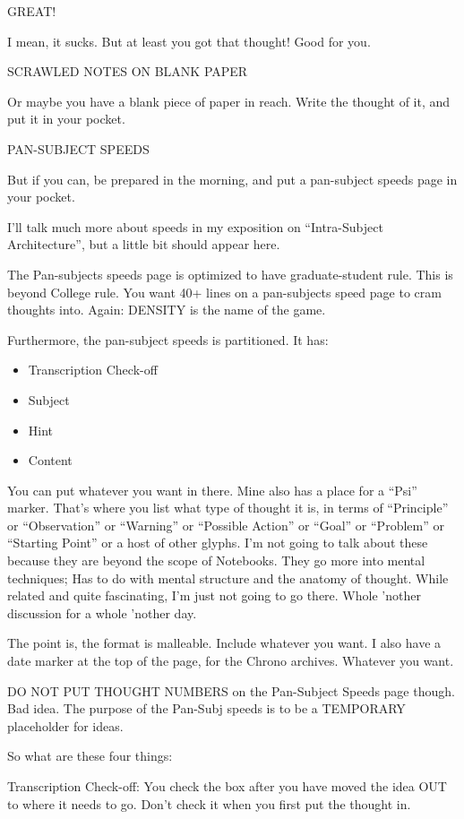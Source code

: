 \documentclass[oneside]{book}
\begin{document}
GREAT!

I mean, it sucks. But at least you got that thought! Good for you.

SCRAWLED NOTES ON BLANK PAPER

Or maybe you have a blank piece of paper in reach. Write the thought
of it, and put it in your pocket.

PAN-SUBJECT SPEEDS

But if you can, be prepared in the morning, and put a pan-subject
speeds page in your pocket.

I'll talk much more about speeds in my exposition on ``Intra-Subject
Architecture'', but a little bit should appear here.

The Pan-subjects speeds page is optimized to have graduate-student
rule. This is beyond College rule. You want 40+ lines on a
pan-subjects speed page to cram thoughts into. Again: DENSITY is the
name of the game.

Furthermore, the pan-subject speeds is partitioned. It has:

\begin{itemize}
\item Transcription Check-off
\item Subject
\item Hint
\item Content
\end{itemize}

You can put whatever you want in there. Mine also has a place for a
``Psi'' marker. That's where you list what type of thought it is, in
terms of ``Principle'' or ``Observation'' or ``Warning'' or ``Possible
Action'' or ``Goal'' or ``Problem'' or ``Starting Point'' or a host of other
glyphs. I'm not going to talk about these because they are beyond the
scope of Notebooks. They go more into mental techniques; Has to do
with mental structure and the anatomy of thought. While related and
quite fascinating, I'm just not going to go there. Whole 'nother
discussion for a whole 'nother day.

The point is, the format is malleable. Include whatever you want. I
also have a date marker at the top of the page, for the Chrono
archives. Whatever you want.

DO NOT PUT THOUGHT NUMBERS on the Pan-Subject Speeds page though. Bad
idea. The purpose of the Pan-Subj speeds is to be a TEMPORARY
placeholder for ideas.

So what are these four things:

Transcription Check-off: You check the box after you have moved the
idea OUT to where it needs to go. Don't check it when you first put
the thought in.
\end{document}
